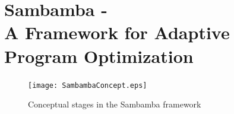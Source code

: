 \section[Sambamba - A Framework for Adaptive Program Optimization]{Sambamba - \\ A Framework for Adaptive Program Optimization}
\begin{figure}
  \centering
  \texttt{[image: SambambaConcept.eps]}
  \caption{Conceptual stages in the Sambamba framework}
  \label{fig:SambambaConcept}
\end{figure}
